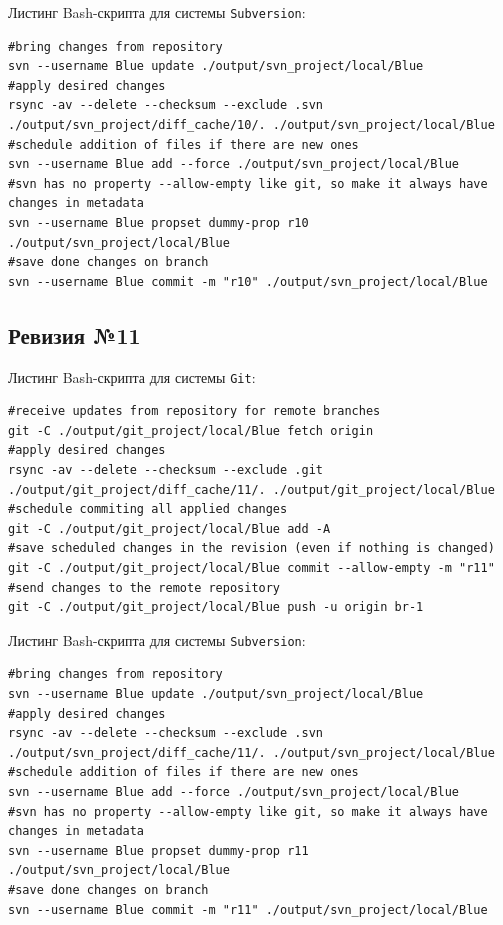 Листинг Bash-скрипта для системы \texttt{Subversion}:
\begin{lstlisting}
#bring changes from repository
svn --username Blue update ./output/svn_project/local/Blue
#apply desired changes
rsync -av --delete --checksum --exclude .svn ./output/svn_project/diff_cache/10/. ./output/svn_project/local/Blue
#schedule addition of files if there are new ones
svn --username Blue add --force ./output/svn_project/local/Blue
#svn has no property --allow-empty like git, so make it always have changes in metadata
svn --username Blue propset dummy-prop r10 ./output/svn_project/local/Blue
#save done changes on branch
svn --username Blue commit -m "r10" ./output/svn_project/local/Blue
\end{lstlisting}


\subsection{Ревизия №11}

Листинг Bash-скрипта для системы \texttt{Git}:
\begin{lstlisting}
#receive updates from repository for remote branches
git -C ./output/git_project/local/Blue fetch origin
#apply desired changes
rsync -av --delete --checksum --exclude .git ./output/git_project/diff_cache/11/. ./output/git_project/local/Blue
#schedule commiting all applied changes
git -C ./output/git_project/local/Blue add -A
#save scheduled changes in the revision (even if nothing is changed)
git -C ./output/git_project/local/Blue commit --allow-empty -m "r11"
#send changes to the remote repository
git -C ./output/git_project/local/Blue push -u origin br-1
\end{lstlisting}

Листинг Bash-скрипта для системы \texttt{Subversion}:
\begin{lstlisting}
#bring changes from repository
svn --username Blue update ./output/svn_project/local/Blue
#apply desired changes
rsync -av --delete --checksum --exclude .svn ./output/svn_project/diff_cache/11/. ./output/svn_project/local/Blue
#schedule addition of files if there are new ones
svn --username Blue add --force ./output/svn_project/local/Blue
#svn has no property --allow-empty like git, so make it always have changes in metadata
svn --username Blue propset dummy-prop r11 ./output/svn_project/local/Blue
#save done changes on branch
svn --username Blue commit -m "r11" ./output/svn_project/local/Blue
\end{lstlisting}


